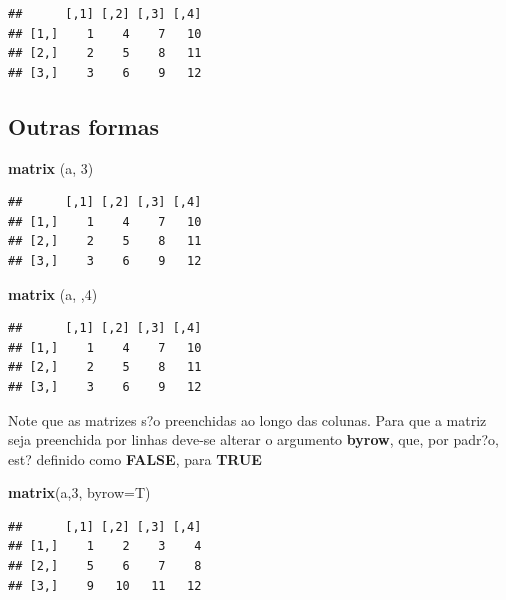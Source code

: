 \documentclass[]{book}
\newenvironment{Shaded}{\begin{snugshade}}{\end{snugshade}}
\newcommand{\DataTypeTok}[1]{\textcolor[rgb]{0.13,0.29,0.53}{#1}}
\newcommand{\DecValTok}[1]{\textcolor[rgb]{0.00,0.00,0.81}{#1}}
\newcommand{\KeywordTok}[1]{\textcolor[rgb]{0.13,0.29,0.53}{\textbf{#1}}}
\newcommand{\NormalTok}[1]{#1}
\begin{document}
\begin{verbatim}
##      [,1] [,2] [,3] [,4]
## [1,]    1    4    7   10
## [2,]    2    5    8   11
## [3,]    3    6    9   12
\end{verbatim}

\hypertarget{outras-formas}{%
\subsection{Outras formas}\label{outras-formas}}

\begin{Shaded}
\begin{Highlighting}[]
\KeywordTok{matrix}\NormalTok{ (a, }\DecValTok{3}\NormalTok{)}
\end{Highlighting}
\end{Shaded}

\begin{verbatim}
##      [,1] [,2] [,3] [,4]
## [1,]    1    4    7   10
## [2,]    2    5    8   11
## [3,]    3    6    9   12
\end{verbatim}

\begin{Shaded}
\begin{Highlighting}[]
\KeywordTok{matrix}\NormalTok{ (a, ,}\DecValTok{4}\NormalTok{)}
\end{Highlighting}
\end{Shaded}

\begin{verbatim}
##      [,1] [,2] [,3] [,4]
## [1,]    1    4    7   10
## [2,]    2    5    8   11
## [3,]    3    6    9   12
\end{verbatim}

Note que as matrizes s?o preenchidas ao longo das colunas. Para que a matriz seja preenchida por linhas deve-se alterar o argumento \textbf{byrow}, que, por padr?o, est? definido como \textbf{FALSE}, para \textbf{TRUE}

\begin{Shaded}
\begin{Highlighting}[]
\KeywordTok{matrix}\NormalTok{(a,}\DecValTok{3}\NormalTok{, }\DataTypeTok{byrow=}\NormalTok{T)}
\end{Highlighting}
\end{Shaded}

\begin{verbatim}
##      [,1] [,2] [,3] [,4]
## [1,]    1    2    3    4
## [2,]    5    6    7    8
## [3,]    9   10   11   12
\end{verbatim}
\end{document}
